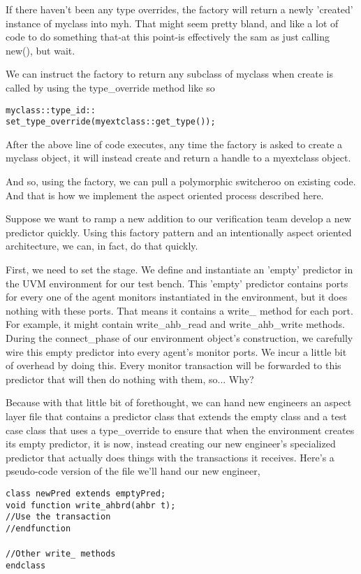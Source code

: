 \documentclass[twocolumn,letterpaper]{IEEEAerospaceCLS}  %
\begin{document}
If there haven't been any type overrides, the factory will return a newly 'created' instance of myclass into myh. That might seem pretty bland, and like a lot of code to do something that-at this point-is effectively the sam as just calling new(), but wait.

We can instruct the factory to return any subclass of myclass when create is called by using the type\_override method like so

\verb|myclass::type_id::|
\\
\verb|set_type_override(myextclass::get_type());|

After the above line of code executes, any time the factory is asked to create a myclass object, it will instead create and return a handle to a myextclass object.  

And so, using the factory, we can pull a polymorphic switcheroo on existing code. And that is how we implement the aspect oriented process described here.

Suppose we want to ramp a new addition to our verification team develop a new predictor quickly. Using this factory pattern and an intentionally aspect oriented architecture, we can, in fact, do that quickly. 

First, we need to set the stage. We define and instantiate an 'empty' predictor in the UVM environment for our test bench. This 'empty' predictor contains ports for every one of the agent monitors instantiated in the environment, but it does nothing with these ports. That means it contains a write\_ method for each port. For example, it might contain write\_ahb\_read and write\_ahb\_write methods. During the connect\_phase of our environment object's construction, we carefully wire this empty predictor into every agent's monitor ports. We incur a little bit of overhead by doing this. Every monitor transaction will be forwarded to this predictor that will then do nothing with them, so... Why?

Because with that little bit of forethought, we can hand new engineers an aspect layer file that contains a predictor class that extends the empty class and a test case class that uses a type\_override to ensure that when the environment creates its empty predictor, it is now, instead creating our new engineer's specialized predictor that actually does things with the transactions it receives. Here's a pseudo-code version of the file we'll hand our new engineer,

\verb|class newPred extends emptyPred;|
\\
\verb|void function write_ahbrd(ahbr t);|
\\
\verb|//Use the transaction|
\\
\verb|//endfunction|
\\
\\
\verb|//Other write_ methods|
\\
\verb|endclass|
\end{document}
